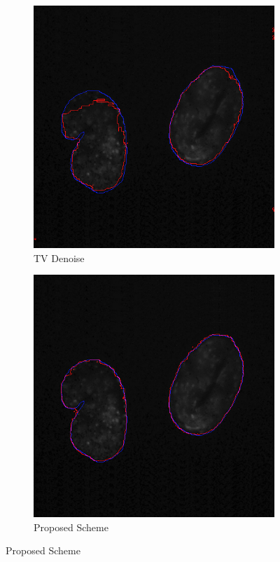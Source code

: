 \documentclass[a4paper,11pt]{ijamas}
\begin{document}
{\begin{figure}
\begin{subfigure}{.25\textwidth}
  \includegraphics[width=0.80\columnwidth]{./figs/results/3tv.jpg}
 \caption{TV Denoise}
  \label{fig:tvseg_3}
\end{subfigure}%
\begin{subfigure}{.25\textwidth}
  \centering
  \includegraphics[width=0.80\columnwidth]{./figs/results/3scheme.jpg}
 \caption{Proposed Scheme}
  \label{fig:schemeseg_3}
\end{subfigure}%



\end{figure}}
\end{document}
